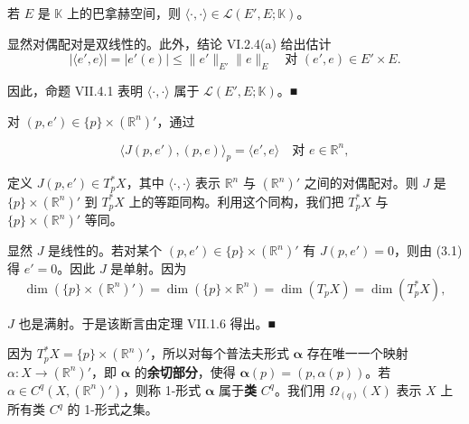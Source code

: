 \begin{remark}

\begin{items}
\item

若 $ E $ 是 $ \mathbb{K} $ 上的巴拿赫空间，则 $ \langle\cdot,\cdot\rangle \in \mathcal{L}(E',E;\mathbb{K}) $。

\proofhead
显然对偶配对是双线性的。此外，结论 VI.2.4(a) 给出估计
\[
|\langle e',e\rangle| = |e'(e)| \le \|e'\|_{E'}\|e\|_{E} \quad \text{对 } (e',e) \in E' \times E .
\]

因此，命题 VII.4.1 表明 $ \langle\cdot,\cdot\rangle $ 属于 $ \mathcal{L}(E',E;\mathbb{K}) $。\nobreak\hspace{0.35em}■

\item

对 $ (p,e') \in \{p\} \times (\mathbb{R}^{n})' $，通过

\begin{equation}
\langle J(p,e'),(p,e)\rangle_{p} = \langle e',e\rangle \quad \text{对 } e \in \mathbb{R}^{n} ,\tag{3.1}
\end{equation}

定义 $ J(p,e') \in T_{p}^{*}X $，其中 $ \langle\cdot,\cdot\rangle $ 表示 $ \mathbb{R}^{n} $ 与 $ (\mathbb{R}^{n})' $ 之间的对偶配对。则 $ J $ 是 $ \{p\} \times (\mathbb{R}^{n})' $ 到 $ T_{p}^{*}X $ 上的等距同构。利用这个同构，我们把 $ T_{p}^{*}X $ 与 $ \{p\} \times (\mathbb{R}^{n})' $ 等同。

\proofhead
显然 $ J $ 是线性的。若对某个 $ (p,e') \in \{p\} \times (\mathbb{R}^{n})' $ 有 $ J(p,e') = 0 $，则由 (3.1) 得 $ e' = 0 $。因此 $ J $ 是单射。因为
\[
\dim\left(\{p\} \times (\mathbb{R}^{n})'\right) = \dim\left(\{p\} \times \mathbb{R}^{n}\right) = \dim(T_{p}X) = \dim(T_{p}^{*}X) ,
\]

$ J $ 也是满射。于是该断言由定理 VII.1.6 得出。\nobreak\hspace{0.35em}■

\end{items}

因为 $ T_{p}^{*}X = \{p\} \times (\mathbb{R}^{n})' $，所以对每个普法夫形式 $ \boldsymbol{\alpha} $ 存在唯一一个映射 $ \alpha : X \to (\mathbb{R}^{n})' $，即 $ \boldsymbol{\alpha} $ 的\textbf{余切部分}，使得 $ \boldsymbol{\alpha}(p) = (p,\alpha(p)) $。若 $ \alpha \in C^{q}\left(X,(\mathbb{R}^{n})'\right) $，则称 1-形式 $ \boldsymbol{\alpha} $ 属于\textbf{类} $ C^{q} $。我们用 $ \Omega_{(q)}(X) $ 表示 $ X $ 上所有类 $ C^{q} $ 的 1-形式之集。


\end{remark}

